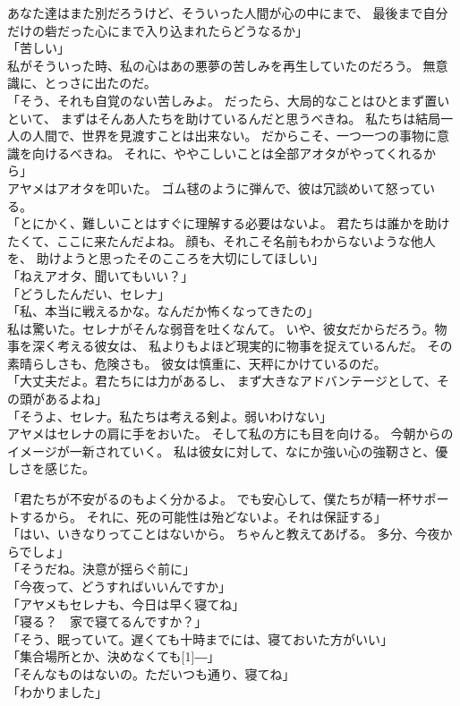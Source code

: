\documentclass[../IHMain]{subfiles}
\begin{document}
あなた達はまた別だろうけど、そういった人間が心の中にまで、
最後まで自分だけの砦だった心にまで入り込まれたらどうなるか」\\
「苦しい」\\
私がそういった時、私の心はあの悪夢の苦しみを再生していたのだろう。
無意識に、とっさに出たのだ。\\
「そう、それも自覚のない苦しみよ。
だったら、大局的なことはひとまず置いといて、
まずはそんあ人たちを助けているんだと思うべきね。
私たちは結局一人の人間で、世界を見渡すことは出来ない。
だからこそ、一つ一つの事物に意識を向けるべきね。
それに、ややこしいことは全部アオタがやってくれるから」\\
アヤメはアオタを叩いた。
ゴム毬のように弾んで、彼は冗談めいて怒っている。\\
「とにかく、難しいことはすぐに理解する必要はないよ。
君たちは誰かを助けたくて、ここに来たんだよね。
顔も、それこそ名前もわからないような他人を、
助けようと思ったそのこころを大切にしてほしい」\\
「ねえアオタ、聞いてもいい？」\\
「どうしたんだい、セレナ」\\
「私、本当に戦えるかな。なんだか怖くなってきたの」\\
私は驚いた。セレナがそんな弱音を吐くなんて。
いや、彼女だからだろう。物事を深く考える彼女は、
私よりもよほど現実的に物事を捉えているんだ。
その素晴らしさも、危険さも。
彼女は慎重に、天秤にかけているのだ。\\
「大丈夫だよ。君たちには力があるし、
まず大きなアドバンテージとして、その頭があるよね」\\
「そうよ、セレナ。私たちは考える剣よ。弱いわけない」\\
アヤメはセレナの肩に手をおいた。
そして私の方にも目を向ける。
今朝からのイメージが一新されていく。
私は彼女に対して、なにか強い心の強靭さと、優しさを感じた。

「君たちが不安がるのもよく分かるよ。
でも安心して、僕たちが精一杯サポートするから。
それに、死の可能性は殆どないよ。それは保証する」\\
「はい、いきなりってことはないから。
ちゃんと教えてあげる。
多分、今夜からでしょ」\\
「そうだね。決意が揺らぐ前に」\\
「今夜って、どうすればいいんですか」\\
「アヤメもセレナも、今日は早く寝てね」\\
「寝る？　家で寝てるんですか？」\\
「そう、眠っていて。遅くても十時までには、寝ておいた方がいい」\\
「集合場所とか、決めなくても\scalebox{3}[1]{―}」\\
「そんなものはないの。ただいつも通り、寝てね」\\
「わかりました」
\end{document}
